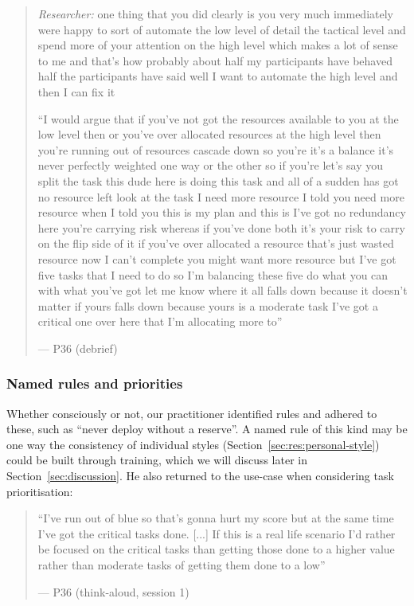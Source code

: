 \begin{quote}\small
{\footnotesize\textit{Researcher:} one thing that you did clearly is you very much immediately were happy to sort of automate the low level of detail the tactical level and spend more of your attention on the high level which makes a lot of sense to me and that's how probably about half my participants have behaved half the participants have said well I want to automate the high level and then I can fix it}\par\smallskip
``I would argue that if you've not got the resources available to you at the low level then or you've over allocated resources at the high level then you're running out of resources cascade down so you're it's a balance it's never perfectly weighted one way or the other so if you're let's say you split the task this dude here is doing this task and all of a sudden has got no resource left look at the task I need more resource I told you need more resource when I told you this is my plan and this is I've got no redundancy here you're carrying risk whereas if you've done both it's your risk to carry on the flip side of it if you've over allocated a resource that's just wasted resource now I can't complete you might want more resource but I've got five tasks that I need to do so I'm balancing these five do what you can with what you've got let me know where it all falls down because it doesn't matter if yours falls down because yours is a moderate task I've got a critical one over here that I'm allocating more to''\par\hfill--- P36 (debrief)
\end{quote}

\subsubsection{Named rules and priorities}\label{sec:qual:practitioner:pt-reserve}\label{sec:qual:practitioner:pt-critical-first}

Whether consciously or not, our practitioner identified rules and adhered to these, such as ``never deploy without a reserve''. A named rule of this kind may be one way the consistency of individual styles (Section~\ref{sec:res:personal-style}) could be built through training, which we will discuss later in Section~\ref{sec:discussion}. He also returned to the use-case when considering task prioritisation:

\begin{quote}\small
``I've run out of blue so that's gonna hurt my score but at the same time I've got the critical tasks done. [...] If this is a real life scenario I'd rather be focused on the critical tasks than getting those done to a higher value rather than moderate tasks of getting them done to a low''\par\hfill--- P36 (think-aloud, session 1)
\end{quote}


